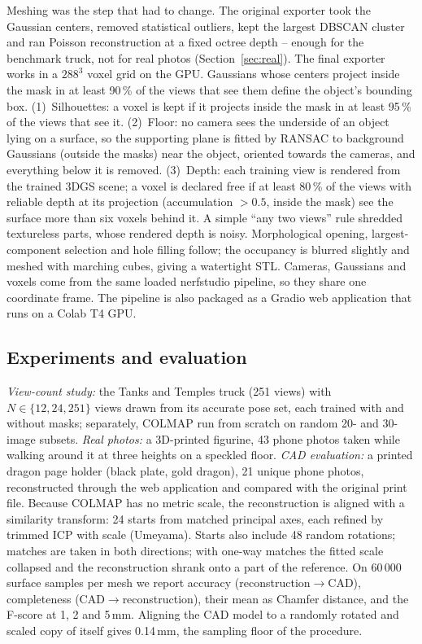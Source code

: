 \documentclass[conference]{IEEEtran}
\begin{document}
Meshing was the step that had to change. The original exporter took the Gaussian centers, removed statistical outliers, kept the largest DBSCAN cluster and ran Poisson reconstruction at a fixed octree depth -- enough for the benchmark truck, not for real photos (Section~\ref{sec:real}). The final exporter works in a $288^3$ voxel grid on the GPU. Gaussians whose centers project inside the mask in at least 90\,\% of the views that see them define the object's bounding box. (1)~Silhouettes: a voxel is kept if it projects inside the mask in at least 95\,\% of the views that see it. (2)~Floor: no camera sees the underside of an object lying on a surface, so the supporting plane is fitted by RANSAC to background Gaussians (outside the masks) near the object, oriented towards the cameras, and everything below it is removed. (3)~Depth: each training view is rendered from the trained 3DGS scene; a voxel is declared free if at least 80\,\% of the views with reliable depth at its projection (accumulation $>0.5$, inside the mask) see the surface more than six voxels behind it. A simple ``any two views'' rule shredded textureless parts, whose rendered depth is noisy. Morphological opening, largest-component selection and hole filling follow; the occupancy is blurred slightly and meshed with marching cubes, giving a watertight STL. Cameras, Gaussians and voxels come from the same loaded nerfstudio pipeline, so they share one coordinate frame. The pipeline is also packaged as a Gradio web application that runs on a Colab T4 GPU.

\subsection{Experiments and evaluation}
\emph{View-count study:} the Tanks and Temples truck \cite{knapitsch2017tanks} (251 views) with $N\in\{12,24,251\}$ views drawn from its accurate pose set, each trained with and without masks; separately, COLMAP run from scratch on random 20- and 30-image subsets. \emph{Real photos:} a 3D-printed figurine, 43 phone photos taken while walking around it at three heights on a speckled floor. \emph{CAD evaluation:} a printed dragon page holder (black plate, gold dragon), 21 unique phone photos, reconstructed through the web application and compared with the original print file. Because COLMAP has no metric scale, the reconstruction is aligned with a similarity transform: 24 starts from matched principal axes, each refined by trimmed ICP with scale (Umeyama). Starts also include 48 random rotations; matches are taken in both directions; with one-way matches the fitted scale collapsed and the reconstruction shrank onto a part of the reference. On 60\,000 surface samples per mesh we report accuracy (reconstruction$\rightarrow$CAD), completeness (CAD$\rightarrow$reconstruction), their mean as Chamfer distance, and the F-score at 1, 2 and 5\,mm. Aligning the CAD model to a randomly rotated and scaled copy of itself gives 0.14\,mm, the sampling floor of the procedure.
\end{document}
